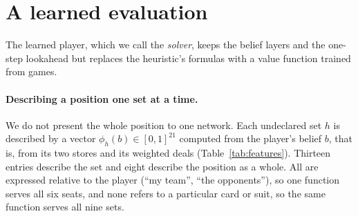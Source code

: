 \documentclass{article}
\begin{document}
\section{A learned evaluation}
\label{sec:solver}

The learned player, which we call the \emph{solver}, keeps the belief layers
and the one-step lookahead but replaces the heuristic's formulas with a value
function trained from games.

\paragraph{Describing a position one set at a time.}
We do not present the whole position to one network.  Each undeclared set $h$
is described by a vector $\phi_h(b) \in [0,1]^{21}$ computed from the player's
belief $b$, that is, from its two stores and its weighted deals
(Table~\ref{tab:features}).  Thirteen entries describe the set and eight
describe the position as a whole.  All are expressed relative to the player
(``my team'', ``the opponents''), so one function serves all six seats, and
none refers to a particular card or suit, so the same function serves all nine
sets.
\end{document}
